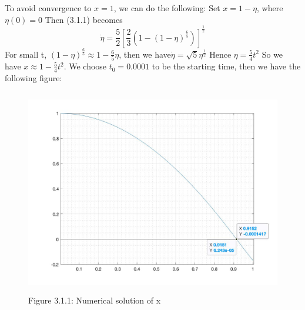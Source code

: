 \documentclass[11pt]{article}
\begin{document}
\newline\newline
To avoid convergence to $x=1$, we can do the following: Set $x = 1-\eta$, where $\eta(0) = 0$
Then (3.1.1) becomes $$\dot{\eta} = \frac{5}{2}[\frac{2}{3}(1-(1-\eta)^{\frac{6}{5}})]^{\frac{1}{2}}$$
For small t, $(1-\eta)^{\frac{6}{5}} \approx 1-\frac{6}{5}\eta$, then we have$\dot{\eta} = \sqrt{5}\eta^{\frac{1}{2}}$ Hence $\eta = \frac{5}{4}t^{2} $
So we have $x \approx 1-\frac{5}{4}t^{2}$. We choose $t_{0} = 0.0001$ to be the starting time, then we have the following figure:
\begin{figure}[H]
\includegraphics[width = 12cm, height = 9cm]{Q3.jpg}
\caption{Figure 3.1.1: Numerical solution of x}
\end{figure}
\end{document}
